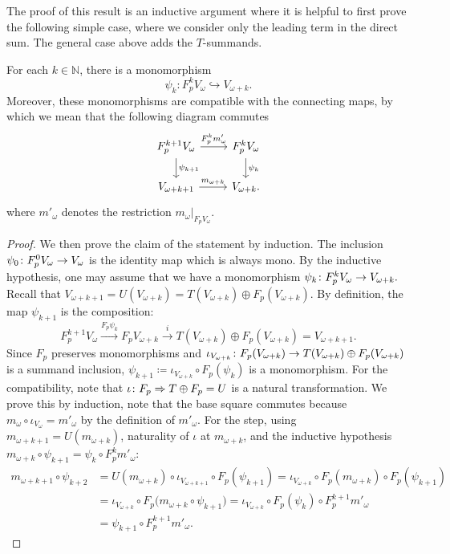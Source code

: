 \documentclass[runningheads]{llncs}
\begin{document}
 \begin{textAtEnd}[category=counterexample]
The proof of this result is an inductive argument where it is helpful to first prove the following simple case, where we consider only the leading term in the direct sum. The general case above adds the $T$-summands.

\begin{lemma}
\label{babysplitting}
For each $k\in \mathbb N$, there is a monomorphism 
\begin{equation*}
\psi_k \colon  F_p^k V_{\omega} \hookrightarrow V_{\omega +k}.
\end{equation*}
Moreover, these monomorphisms are compatible with the connecting maps, by which we mean that the following diagram commutes
$$
\begin{tikzcd}[ampersand replacement=\&]
F_p^{k+1} V_\omega \dar{\psi_{k+1}}  \arrow[r, "F_p^k m'_{\omega}"] \& F_p^{k} V_\omega \dar{\psi_k} \\
V_{\omega +k+1} \arrow[r, "m_{\omega+k}"] \& V_{\omega +k}.
\end{tikzcd}
$$
where $m'_{\omega}$ denotes the restriction $m_{\omega}|_{F_pV_{\omega}}$.
\end{lemma}

\begin{proof}
We then prove the claim of the statement by induction. 
The inclusion $\psi_0 \colon F_p^0 V_{\omega} \to  V_{\omega}$ is the identity map which is always mono. 
By the inductive hypothesis, one may assume that we have a monomorphism  $\psi_k \colon  F_p^k V_\omega \to  V_{\omega+k}.$ 
Recall that $V_{\omega+k +1} = U(V_{\omega+k}) = T(V_{\omega+k}) \oplus F_p(V_{\omega+k}).$ 
By definition, the map $\psi_{k+1}$ is the composition:
\begin{equation*}
F_p^{k+1}V_\omega \xrightarrow{F_p\psi_k} F_pV_{\omega +k } \xrightarrow{i} T(V_{\omega+k}) \oplus F_p(V_{\omega+k}) = V_{\omega+k+1}.
\end{equation*}
Since $F_p$ preserves monomorphisms and $\iota_{V_{\omega+k}} \colon F_p(V_{\omega+k}) \to T(V_{\omega+k}) \oplus F_p(V_{\omega+k})$ is a summand inclusion, $\psi_{k+1} \coloneqq \iota_{V_{\omega+k}} \circ F_p(\psi_k)$ is a monomorphism. 
For the compatibility, note that $\iota \colon F_p \Rightarrow T \oplus F_p = U$ is a natural transformation. 
We prove this by induction, note that the base square commutes because $m_\omega \circ \iota_{V_\omega} = m'_\omega$ by the definition of $m'_\omega$. 
For the step, using $m_{\omega+k+1} = U(m_{\omega+k})$, naturality of $\iota$ at $m_{\omega+k}$, and the inductive hypothesis $m_{\omega+k} \circ \psi_{k+1} = \psi_k \circ F_p^k m'_\omega$:
\begin{align*}
m_{\omega+k+1} \circ \psi_{k+2}
&= U(m_{\omega+k}) \circ \iota_{V_{\omega+k+1}} \circ F_p(\psi_{k+1})
= \iota_{V_{\omega+k}} \circ F_p(m_{\omega+k}) \circ F_p(\psi_{k+1})\\
&= \iota_{V_{\omega+k}} \circ F_p\bigl(m_{\omega+k} \circ \psi_{k+1}\bigr)
= \iota_{V_{\omega+k}} \circ F_p(\psi_k) \circ F_p^{k+1} m'_\omega
\\
&= \psi_{k+1} \circ F_p^{k+1} m'_\omega.
\end{align*}
\end{proof}
 \end{textAtEnd}
\end{document}
